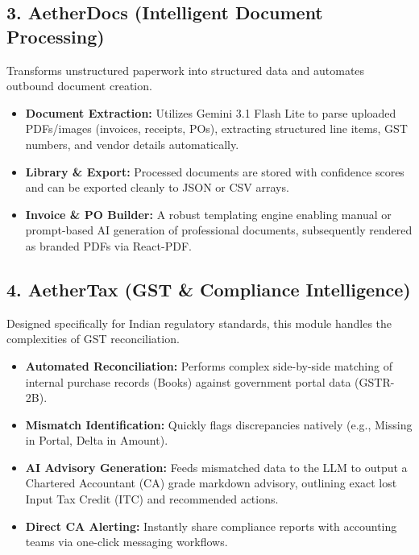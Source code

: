 \documentclass[12pt,a4paper]{article}
\begin{document}
\subsection{3. AetherDocs (Intelligent Document Processing)}
Transforms unstructured paperwork into structured data and automates outbound document creation.
\begin{itemize}[label=\textcolor{AetherLavender}{\textbullet}]
    \item \textbf{Document Extraction:} Utilizes Gemini 3.1 Flash Lite to parse uploaded PDFs/images (invoices, receipts, POs), extracting structured line items, GST numbers, and vendor details automatically.
    \item \textbf{Library \& Export:} Processed documents are stored with confidence scores and can be exported cleanly to JSON or CSV arrays.
    \item \textbf{Invoice \& PO Builder:} A robust templating engine enabling manual or prompt-based AI generation of professional documents, subsequently rendered as branded PDFs via React-PDF.
\end{itemize}

\subsection{4. AetherTax (GST \& Compliance Intelligence)}
Designed specifically for Indian regulatory standards, this module handles the complexities of GST reconciliation.
\begin{itemize}[label=\textcolor{AetherLavender}{\textbullet}]
    \item \textbf{Automated Reconciliation:} Performs complex side-by-side matching of internal purchase records (Books) against government portal data (GSTR-2B).
    \item \textbf{Mismatch Identification:} Quickly flags discrepancies natively (e.g., Missing in Portal, Delta in Amount).
    \item \textbf{AI Advisory Generation:} Feeds mismatched data to the LLM to output a Chartered Accountant (CA) grade markdown advisory, outlining exact lost Input Tax Credit (ITC) and recommended actions.
    \item \textbf{Direct CA Alerting:} Instantly share compliance reports with accounting teams via one-click messaging workflows.
\end{itemize}
\end{document}
